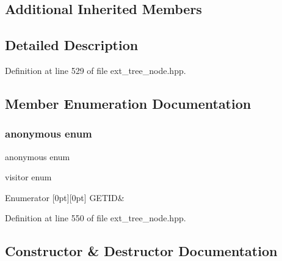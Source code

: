 \subsection*{Additional Inherited Members}


\subsection{Detailed Description}


Definition at line 529 of file ext\+\_\+tree\+\_\+node.\+hpp.



\subsection{Member Enumeration Documentation}
\mbox{\label{structomp__critical__pragma_a939bef2bd1af18e03fd4fb688bbdc57c}} 
\subsubsection{\texorpdfstring{anonymous enum}{anonymous enum}}
{\footnotesize\ttfamily anonymous enum}



visitor enum 

\begin{DoxyEnumFields}{Enumerator}
[0pt][0pt]{}\mbox{\label{structomp__critical__pragma_a939bef2bd1af18e03fd4fb688bbdc57ca9ccff441499e54fb35fd353b3453e355}} 
G\+E\+T\+ID&\\
\hline

\end{DoxyEnumFields}


Definition at line 550 of file ext\+\_\+tree\+\_\+node.\+hpp.



\subsection{Constructor \& Destructor Documentation}
\mbox{\label{structomp__critical__pragma_ac3ae7508f5ab4c23cb78abf8aa31978e}} 
